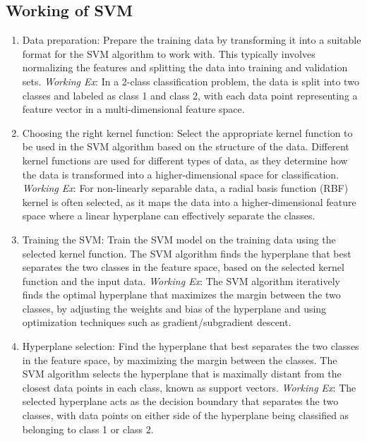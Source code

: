 \documentclass[hidelinks]{book}
\begin{document}
\subsection{Working of SVM}
\begin{enumerate}
	\item Data preparation: Prepare the training data by transforming it into a suitable format for the SVM algorithm to work with. This typically involves normalizing the features and splitting the data into training and validation sets. \newline
	\textit{Working Ex}: In a 2-class classification problem, the data is split into two classes and labeled as class 1 and class 2, with each data point representing a feature vector in a multi-dimensional feature space.

	\item Choosing the right kernel function: Select the appropriate kernel function to be used in the SVM algorithm based on the structure of the data. Different kernel functions are used for different types of data, as they determine how the data is transformed into a higher-dimensional space for classification. \newline
	\textit{Working Ex}: For non-linearly separable data, a radial basis function (RBF) kernel is often selected, as it maps the data into a higher-dimensional feature space where a linear hyperplane can effectively separate the classes.

	\item Training the SVM: Train the SVM model on the training data using the selected kernel function. The SVM algorithm finds the hyperplane that best separates the two classes in the feature space, based on the selected kernel function and the input data. \newline
	\textit{Working Ex}: The SVM algorithm iteratively finds the optimal hyperplane that maximizes the margin between the two classes, by adjusting the weights and bias of the hyperplane and using optimization techniques such as gradient/subgradient descent.

	\item Hyperplane selection: Find the hyperplane that best separates the two classes in the feature space, by maximizing the margin between the classes. The SVM algorithm selects the hyperplane that is maximally distant from the closest data points in each class, known as support vectors. \newline
	\textit{Working Ex}: The selected hyperplane acts as the decision boundary that separates the two classes, with data points on either side of the hyperplane being classified as belonging to class 1 or class 2.


\end{enumerate}
\end{document}
